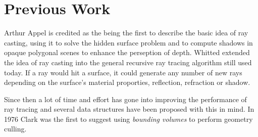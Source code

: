 




\chapter{Previous Work}



Arthur Appel is credited as the being the first to describe the basic
idea of ray casting, using it to solve the hidden
surface problem and to compute shadows in opaque polygonal scenes to
enhance the perseption of depth. Whitted extended the idea of ray
casting into the general recursive ray tracing algorithm still used
today. If a ray would hit a surface, it could
generate any number of new rays depending on the surface's material
proporties, reflection, refraction or shadow.



Since then a lot of time and effort has gone into improving the
performance of ray tracing and several data structures have been
proposed with this in mind. In 1976 Clark was the first to suggest
using \textit{bounding volumes} to perform geometry culling. 








